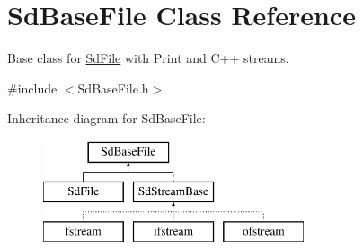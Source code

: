 \hypertarget{class_sd_base_file}{}\section{Sd\+Base\+File Class Reference}
\label{class_sd_base_file}


Base class for \hyperlink{class_sd_file}{Sd\+File} with Print and C++ streams.  




{\ttfamily \#include $<$Sd\+Base\+File.\+h$>$}

Inheritance diagram for Sd\+Base\+File\+:\begin{figure}[H]
\begin{center}
\leavevmode
\includegraphics[height=3.000000cm]{class_sd_base_file}
\end{center}
\end{figure}
